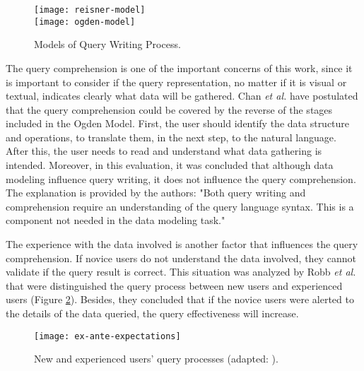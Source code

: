 \begin{figure}[htbp]
  \centering
    {\texttt{[image: reisner-model]}}%
    \\
    {\texttt{[image: ogden-model]}}%
\caption{Models of Query Writing Process.}
  \label{fig:models_of_query_writing_process}
\end{figure}

The query comprehension is one of the important concerns of this work, since it is important to consider if the query representation, no matter if it is visual or textual, indicates clearly what data will be gathered. %
Chan \textit{et al.} \cite{anEvaluationOfNoviceEndUserComputingPerformance} have postulated that the query comprehension could be covered by the reverse of the stages included in the Ogden Model. First, the user should identify the data structure and operations, to translate them, in the next step, to the natural language. After this, the user needs to read and understand what data gathering is intended. Moreover, in this evaluation, it was concluded that although data modeling influence query writing, it does not influence the query comprehension. The explanation is provided by the authors: "Both query writing and comprehension require an understanding of the query language syntax. This is a component not needed in the data modeling task."

The experience with the data involved is another factor that influences the query comprehension. If novice users do not understand the data involved, they cannot validate if the query result is correct. This situation was analyzed by Robb \textit{et al.} \cite{improvingNewUsersQueryPerformance} that were distinguished the query process between new users and experienced users (Figure \ref{fig:ex_ante_expectations}). Besides, they concluded that if the novice users were alerted to the details of the data queried, the query effectiveness will increase.

\begin{figure}[htbp]
  \centering
    {\texttt{[image: ex-ante-expectations]}}%
\caption{New and experienced users’ query processes (adapted: \cite{improvingNewUsersQueryPerformance}).}
  \label{fig:ex_ante_expectations}
\end{figure}


